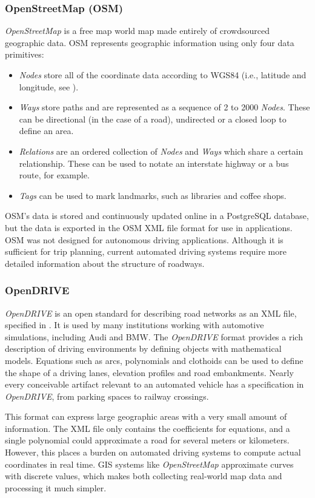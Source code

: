 \documentclass[12pt,twoside]{article}
\begin{document}
\subsubsection{OpenStreetMap (OSM)}
\textit{OpenStreetMap} is a free map world map made entirely of crowdsourced geographic data. OSM represents geographic information using only four data primitives:
\begin{itemize}
  \item \textit{Nodes} store all of the coordinate data according to WGS84 (i.e., latitude and longitude, see \cite{WGS84}).
  \item \textit{Ways} store paths and are represented as a sequence of 2 to 2000 \textit{Nodes}. These can be directional (in the case of a road), undirected or a closed loop to define an area.
  \item \textit{Relations} are an ordered collection of \textit{Nodes} and \textit{Ways} which share a certain relationship. These can be used to notate an interstate highway or a bus route, for example.
  \item \textit{Tags} can be used to mark landmarks, such as libraries and coffee shops.
\end{itemize}
OSM's data is stored and continuously updated online in a PostgreSQL database, but the data is exported in the OSM XML file format for use in applications. OSM was not designed for autonomous driving applications. Although it is sufficient for trip planning, current automated driving systems require more detailed information about the structure of roadways.

\subsubsection{OpenDRIVE}
\textit{OpenDRIVE} is an open standard for describing road networks as an XML file, specified in \cite{OpenDRIVE}. It is used by many institutions working with automotive simulations, including Audi and BMW. The \textit{OpenDRIVE} format provides a rich description of driving environments by defining objects with mathematical models. Equations such as arcs, polynomials and clothoids can be used to define the shape of a driving lanes, elevation profiles and road embankments. Nearly every conceivable artifact relevant to an automated vehicle has a specification in \textit{OpenDRIVE}, from parking spaces to railway crossings.

This format can express large geographic areas with a very small amount of information. The XML file only contains the coefficients for equations, and a single polynomial could approximate a road for several meters or kilometers. However, this places a burden on automated driving systems to compute actual coordinates in real time. GIS systems like \textit{OpenStreetMap} approximate curves with discrete values, which makes both collecting real-world map data and processing it much simpler.
\end{document}
